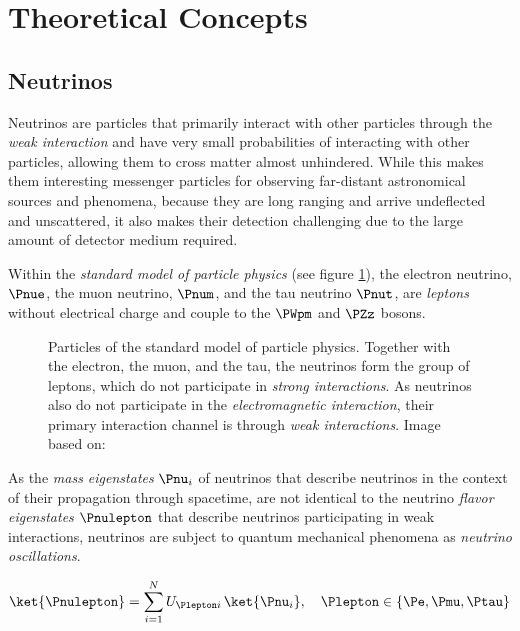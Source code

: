 
\section{Theoretical Concepts}
\label{sec:theoretical_background}

\subsection{Neutrinos}
\label{sec:neutrinos}

Neutrinos are particles that primarily interact with other particles through the \textit{weak interaction} and have very small probabilities of interacting with other particles, allowing them to cross matter almost unhindered. While this makes them interesting messenger particles for observing far-distant astronomical sources and phenomena, because they are long ranging and arrive undeflected and unscattered, it also makes their detection challenging due to the large amount of detector medium required. \cite{lexikonderphysik, instrumentation}

Within the \textit{standard model of particle physics} (see figure \ref{fig:Pheith9i}), the electron neutrino, $\Pnue$, the muon neutrino, $\Pnum$, and the tau neutrino $\Pnut$, are \textit{leptons} without electrical charge and couple to the $\PWpm$ and $\PZz$ bosons.

\begin{figure}[htbp]
  \caption{Particles of the standard model of particle physics. Together with the electron, the muon, and the tau, the neutrinos form the group of leptons, which do not participate in \textit{strong interactions}. As neutrinos also do not participate in the \textit{electromagnetic interaction}, their primary interaction channel is through \textit{weak interactions}. Image based on: \cite{standardmodel}}
  \label{fig:Pheith9i}
\end{figure}

As the \textit{mass eigenstates} $\Pnu_i$ of neutrinos that describe neutrinos in the context of their propagation through spacetime, are not identical to the neutrino \textit{flavor eigenstates} $\Pnulepton$ that describe neutrinos participating in weak interactions, neutrinos are subject to quantum mechanical phenomena as \textit{neutrino oscillations}. \cite{particledatareview}

$$
  \ket{\Pnulepton} = \sum_{i=1}^N U_{\Plepton i}\,\ket{\Pnu_i}, \ \ \ \Plepton \in \{ \Pe, \Pmu, \Ptau \}
$$

